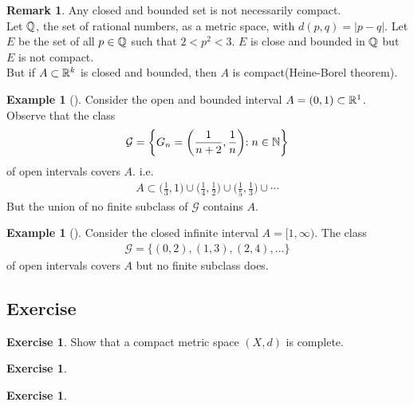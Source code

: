 \documentclass[	DIV=calc,paper=a4,fontsize=11pt]{scrartcl}	 	%
\theoremstyle{definition}
\newtheorem{exmp}[thm]{Example}
\newtheorem{exer}[thm]{Exercise}
\newtheorem{rem}[thm]{Remark}
\theoremstyle{plain}
\theoremstyle{remark}
\begin{document}
\begin{rem}\color{red} Any closed and bounded set is not necessarily compact.\\
Let $\Bbb Q$, the set of rational numbers, as a metric space, with $d(p,q)=|p-q|$. Let $E$ be the set of all $p\in \Bbb Q$ such that $2<p^2<3$. $E$ is close and bounded in $\Bbb Q$ but $E$ is not compact.\\
But if $A\subset \Bbb R^k$ is closed and bounded, then $A$ is compact(Heine-Borel theorem).
\end{rem}

\begin{exmp}[]
Consider the open and bounded interval $A=(0,1)\subset \Bbb R^1$. Observe that the class
\begin{align}
\mathcal{G}=\biggl\{G_n=\biggl(\frac{1}{n+2},\frac{1}{n}\biggl):n\in \Bbb N\biggl\}
\end{align}
of open intervals covers $A$. i.e.
\begin{align*}
A\subset \biggl(\frac{1}{3},1\biggl)\cup\biggl(\frac{1}{4},\frac{1}{2}\biggl)\cup\biggl(\frac{1}{5},\frac{1}{3}\biggl)\cup\cdots
\end{align*}
But the union of no finite subclass of $\mathcal{G}$ contains $A$.
\end{exmp}

\begin{exmp}[]
Consider the  closed infinite interval $A=[1,\infty)$. The class
\begin{align}
\mathcal{G}=\{(0,2),(1,3),(2,4),\ldots\}
\end{align}
of open intervals covers $A$ but no finite subclass does.
\end{exmp}

\newpage
\subsection{Exercise}

\begin{exer}\label{031}
Show that a compact metric space $(X,d)$ is complete.
\end{exer}

\begin{exer}\label{032}
\end{exer}

\begin{exer}\label{033}
\end{exer}
\end{document}
